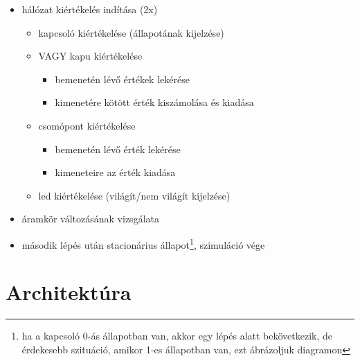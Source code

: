 {\begin{itemize}
\begin{itemize}
\setlength{\itemsep}{0cm}%
\setlength{\parskip}{0cm}%
\item hálózat kiértékelés indítása (2x)
\begin{itemize}
\setlength{\itemsep}{0cm}%
\setlength{\parskip}{0cm}%
\item kapcsoló kiértékelése (állapotának kijelzése)
\item VAGY kapu kiértékelése
\begin{itemize}
\setlength{\itemsep}{0cm}%
\setlength{\parskip}{0cm}%
\item bemenetén lévő értékek lekérése
\item kimenetére kötött érték kiszámolása és kiadása
\end{itemize}
\item csomópont kiértékelése
\begin{itemize}
\setlength{\itemsep}{0cm}%
\setlength{\parskip}{0cm}%
\item bemenetén lévő érték lekérése
\item kimeneteire az érték kiadása
\end{itemize}
\item led kiértékelése (világít/nem világít kijelzése)
\end{itemize}
\item áramkör változásának vizsgálata
\item második lépés után stacionárius állapot\footnote{ha a kapcsoló 0-ás állapotban van, akkor egy lépés alatt bekövetkezik, de érdekesebb szituáció, amikor 1-es állapotban van, ezt ábrázoljuk diagramon}, szimuláció vége
\end{itemize}
\end{itemize}
\vspace{-15pt}}

\section{Architektúra}

